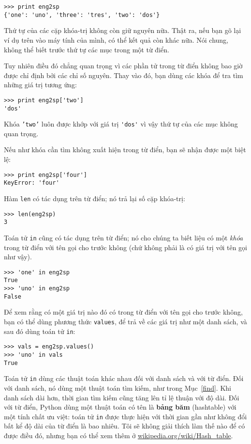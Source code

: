 \documentclass[11pt]{book}
\begin{document}
\beforeverb
\begin{verbatim}
>>> print eng2sp
{'one': 'uno', 'three': 'tres', 'two': 'dos'}
\end{verbatim}
\afterverb
%
Thứ tự của các cặp khóa-trị không còn giữ nguyên nữa. Thật ra, 
nếu bạn gõ lại ví dụ trên vào máy tính của mình, có thể kết
quả còn khác nữa. Nói chung, không thể biết trước thứ tự các mục 
trong một từ điển.

Tuy nhiên điều đó chẳng quan trọng vì các phần tử trong từ điển
không bao giờ được chỉ định bởi các chỉ số nguyên. Thay vào đó, bạn
dùng các khóa để tra tìm những giá trị tương ứng:

\beforeverb
\begin{verbatim}
>>> print eng2sp['two']
'dos'
\end{verbatim}
\afterverb
%
Khóa {\tt 'two'} luôn được khớp với giá trị \verb"'dos'" vì vậy
thứ tự của các mục không quan trọng.

Nếu như khóa cần tìm không xuất hiện trong từ điển, bạn sẽ nhận được
một biệt lệ:


\beforeverb
\begin{verbatim}
>>> print eng2sp['four']
KeyError: 'four'
\end{verbatim}
\afterverb
%
Hàm {\tt len} có tác dụng trên từ điển; nó trả lại số cặp khóa-trị:


\beforeverb
\begin{verbatim}
>>> len(eng2sp)
3
\end{verbatim}
\afterverb
%
Toán tử {\tt in} cũng có tác dụng trên từ điển; nó cho chúng ta biết liệu
có một {\em khóa} trong từ điển với tên gọi cho trước không (chứ không phải
là có giá trị với tên gọi như vậy).


\beforeverb
\begin{verbatim}
>>> 'one' in eng2sp
True
>>> 'uno' in eng2sp
False
\end{verbatim}
\afterverb
%
Để xem rằng có một giá trị nào đó có trong từ điển với tên gọi cho trước không,
bạn có thể dùng phương thức {\tt values}, để trả về các giá trị như một
danh sách, và sau đó dùng toán tử {\tt in}:


\beforeverb
\begin{verbatim}
>>> vals = eng2sp.values()
>>> 'uno' in vals
True
\end{verbatim}
\afterverb
%
Toán tử {\tt in} dùng các thuật toán khác nhau đối với danh sách và với từ điển.
Đối với danh sách, nó dùng một thuật toán tìm kiếm, như trong Mục~\ref{find}.  
Khi danh sách dài hơn, thời gian tìm kiếm cũng tăng lên tỉ lệ thuận với độ dài.
Đối với từ điển, Python dùng một thuật toán có tên là {\bf bảng băm} (hashtable)
với một tính chất ưu việt: toán tử {\tt in} được thực hiện với thời gian 
gần như không đổi bất kể độ dài của từ điển là bao nhiêu. Tôi sẽ không giải 
thích làm thế nào để có được điều đó, nhưng bạn có thể xem thêm ở
\url{wikipedia.org/wiki/Hash_table}.
\end{document}
